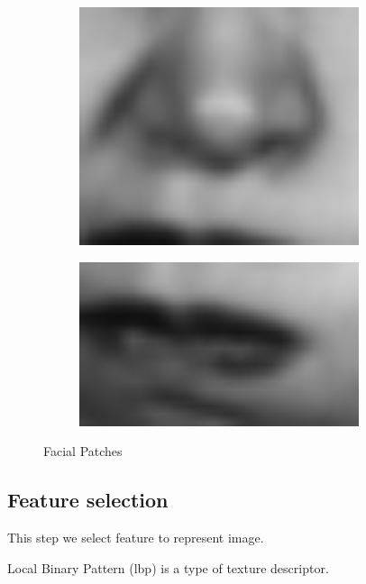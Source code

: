 \documentclass[a4paper, 12pt]{article}
\begin{document}
\begin{figure}[H]
\begin{subfigure}[b]{0.2\textwidth}
	\end{subfigure}
	\begin{subfigure}[b]{0.2\textwidth}
		\includegraphics[width=0.9\textwidth]{./processed/nose.png}
	\end{subfigure}
	\begin{subfigure}[b]{0.2\textwidth}
		\includegraphics[width=0.9\textwidth]{./processed/mouth.png}
	\end{subfigure}
	\caption[]{Facial Patches}
	\label{fig:beforepre}
\end{figure}


\subsection{Feature selection}

	This step we select feature to represent image. 
	
	Local Binary Pattern (lbp) is a type of texture descriptor\cite{pietikainen2010local}. 
	
\end{document}
